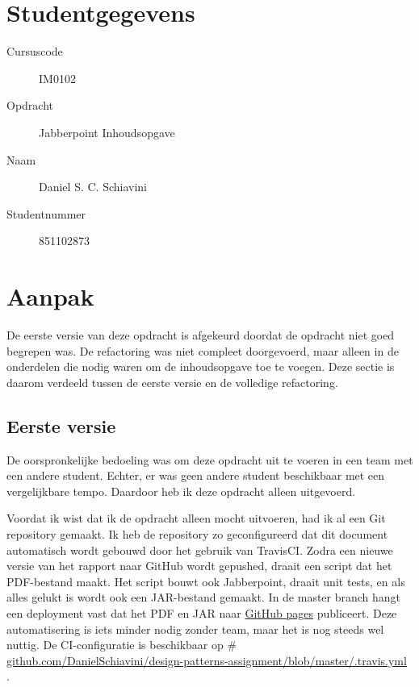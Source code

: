 \documentclass[a4paper]{article}
\makeatletter
\newcommand*{\repo}{\begingroup\@makeother\#\@repo}
\newcommand*{\@repo}[2]{%
  \href{https://github.com/DanielSchiavini/design-patterns-assignment/#1}{#2}%
  \endgroup}
\newcommand{\repolink}[1]{\repo{#1}{github.com\-/Daniel\-Schiavini\-/de\-sign-\-pat\-terns-\-as\-sign\-ment\-/#1}}
\makeatother
\begin{document}
\pagestyle{fancy}

\section*{Studentgegevens}
    \begin{description}
        \item [Cursuscode] IM0102
        \item [Opdracht] Jabberpoint Inhoudsopgave
        \item [Naam] Daniel S. C. Schiavini
        \item [Studentnummer] 851102873
    \end{description}

\section*{Aanpak}
    \label{sec:aanpak}
	De eerste versie van deze opdracht is afgekeurd doordat de opdracht niet goed begrepen was.
	De refactoring was niet compleet doorgevoerd, maar alleen in de onderdelen die nodig waren om de inhoudsopgave toe te voegen.
	Deze sectie is daarom verdeeld tussen de eerste versie en de volledige refactoring.

	\subsection*{Eerste versie}
    De oorspronkelijke bedoeling was om deze opdracht uit te voeren in een team met een andere student.
    Echter, er was geen andere student beschikbaar met een vergelijkbare tempo.
    Daardoor heb ik deze opdracht alleen uitgevoerd.

    Voordat ik wist dat ik de opdracht alleen mocht uitvoeren, had ik al een Git repository gemaakt.
    Ik heb de repository zo geconfigureerd dat dit document automatisch wordt gebouwd door het gebruik van TravisCI.
    Zodra een nieuwe versie van het rapport naar GitHub wordt gepushed, draait een script dat het PDF-bestand maakt.
    Het script bouwt ook Jabberpoint, draait unit tests, en als alles gelukt is wordt ook een JAR-bestand gemaakt.
    In de master branch hangt een deployment vast dat het PDF en JAR naar \href{https://github.com/DanielSchiavini/design-patterns-assignment/tree/gh-pages}{GitHub pages} publiceert.
    Deze automatisering is iets minder nodig zonder team, maar het is nog steeds wel nuttig.
    De CI-configuratie is beschikbaar op \repolink{blob/master/.travis.yml}.
\end{document}
